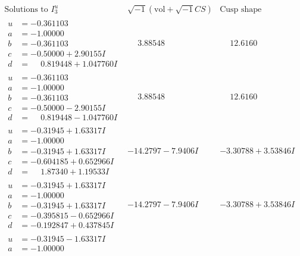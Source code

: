 \documentclass[1p]{elsarticle_modified}
\theoremstyle{definition}
\newcommand{\I}{\sqrt{-1}}
\begin{document}
$$\begin{array}{c|c|c}  
\text{Solutions to }I^u_{3}& \I (\text{vol} + \sqrt{-1}CS) & \text{Cusp shape}\\
 \hline 
\begin{aligned}
u &= -0.361103\phantom{ +0.000000I} \\
a &= -1.00000\phantom{ +0.000000I} \\
b &= -0.361103\phantom{ +0.000000I} \\
c &= -0.50000 + 2.90155 I \\
d &= \phantom{-}0.819448 + 1.047760 I\end{aligned}
 & \phantom{-}3.88548\phantom{ +0.000000I} & \phantom{-}12.6160\phantom{ +0.000000I} \\ \hline\begin{aligned}
u &= -0.361103\phantom{ +0.000000I} \\
a &= -1.00000\phantom{ +0.000000I} \\
b &= -0.361103\phantom{ +0.000000I} \\
c &= -0.50000 - 2.90155 I \\
d &= \phantom{-}0.819448 - 1.047760 I\end{aligned}
 & \phantom{-}3.88548\phantom{ +0.000000I} & \phantom{-}12.6160\phantom{ +0.000000I} \\ \hline\begin{aligned}
u &= -0.31945 + 1.63317 I \\
a &= -1.00000\phantom{ +0.000000I} \\
b &= -0.31945 + 1.63317 I \\
c &= -0.604185 + 0.652966 I \\
d &= \phantom{-}1.87340 + 1.19533 I\end{aligned}
 & -14.2797 - 7.9406 I & -3.30788 + 3.53846 I \\ \hline\begin{aligned}
u &= -0.31945 + 1.63317 I \\
a &= -1.00000\phantom{ +0.000000I} \\
b &= -0.31945 + 1.63317 I \\
c &= -0.395815 - 0.652966 I \\
d &= -0.192847 + 0.437845 I\end{aligned}
 & -14.2797 - 7.9406 I & -3.30788 + 3.53846 I \\ \hline\begin{aligned}
u &= -0.31945 - 1.63317 I \\
a &= -1.00000\phantom{ +0.000000I} \\

\end{aligned}
\end{array}$$
\end{document}

